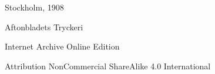 \documentclass[a4paper, 11pt, oneside, polutonikogreek, english]{article}
\begin{document}
\begin{titlepage}
	
		
	\vspace*{\fill}%
	
	
	{Stockholm, 1908} %
 
        {\small Aftonbladets Tryckeri}

	\vspace{1\baselineskip} %

        Internet Archive Online Edition  %
	
	{\small Attribution NonCommercial ShareAlike 4.0 International } %
\end{titlepage}
\clearpage
\Large
\setlength{\parskip}{1mm plus1mm minus1mm}
\end{document}
